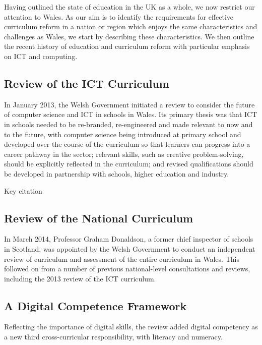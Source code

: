 \documentclass[sigconf]{acmart}
\begin{document}
Having outlined the state of education in the UK as a whole, we now
restrict our attention to Wales. As our aim is to identify the
requirements for effective curriculum reform in a nation or region
which enjoys the same characteristics and challenges as Wales, we
start by describing these characteristics. We then outline the recent
history of education and curriculum reform with particular emphasis on
ICT and computing.

\subsection{Review of the ICT Curriculum}

In January 2013, the Welsh Government initiated a review to consider
the future of computer science and ICT in schools in Wales. Its
primary thesis was that ICT in schools needed to be re-branded,
re-engineered and made relevant to now and to the future, with
computer science being introduced at primary school and developed over
the course of the curriculum so that learners can progress into a
career pathway in the sector; relevant skills, such as creative
problem-solving, should be explicitly reflected in the curriculum; and
revised qualifications should be developed in partnership with
schools, higher education and industry.

Key citation~\cite{wgictreview:2013}

\subsection{Review of the National Curriculum}

In March 2014, Professor Graham Donaldson, a former chief inspector of
schools in Scotland, was appointed by the Welsh Government to conduct
an independent review of curriculum and assessment of the entire
curriculum in Wales. This followed on from a number of previous
national-level consultations and reviews, including the 2013 review of
the ICT curriculum.

\subsection{A Digital Competence Framework}

Reflecting the importance of digital skills, the review added digital
competency as a new third cross-curricular responsibility, with
literacy and numeracy.
\end{document}
